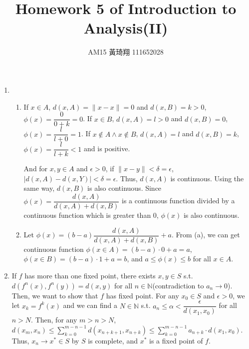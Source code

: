 \documentclass[12pt]{article}
\title{Homework 5 of Introduction to Analysis(II)}
\author{AM15 黃琦翔 111652028}
\begin{document}
\maketitle
\begin{enumerate}
    \item \begin{enumerate}
        \item If $x\in A$, $d(x, A) = \| x-x \| = 0$ and $d(x, B) = k > 0$, $\phi(x) = \dfrac{0}{0 + k} = 0$.
        If $x\in B$, $d(x, A) = l > 0$ and $d(x, B) = 0$, $\phi(x) = \dfrac{l}{l + 0} = 1$.
        If $x \notin A \wedge x \notin B$, $d(x, A) = l$ and $d(x, B) = k$, $\phi(x) = \dfrac{l}{l+k} < 1$ and is positive.

        And for $x, y \in A$ and $\epsilon > 0$,
        if $\| x- y \| < \delta = \epsilon$, 
        $|d(x, A) - d(x, Y)| < \delta = \epsilon$.
        Thus, $d(x, A)$ is continuous.
        Using the same way, $d(x, B)$ is also continuous.
        Since $\phi(x) = \dfrac{d(x, A)}{d(x, A)+d(x, B)}$ is a continuous function divided by a continuous function which is greater than $0$,
        $\phi(x)$ is also continuous.

        \item Let $\phi(x) = (b-a)\dfrac{d(x, A)}{d(x, A) + d(x, B)} + a$.
        From (a), we can get continuous function $\phi(x\in A) = (b-a)\cdot 0 + a = a$, $\phi(x\in B) = (b-a)\cdot 1 + a = b$,
        and $a \leq \phi(x)\leq b$ for all $x\in A$.
    \end{enumerate}

    \item If $f$ has more than one fixed point, there exists $x, y\in S$ s.t. $d(f^n(x), f^n(y)) = d(x, y)$ for all $n\in\mathbb{N}$(contradiction to $a_n \to 0$).
    Then, we want to show that $f$ has fixed point.
    For any $x_0\in S$ and $\epsilon > 0$, we let $x_k = f^k(x)$ and we can find a $N\in\mathbb{N}$ s.t. $a_n \leq \alpha < \dfrac{\epsilon}{d(x_1, x_0)}$ for all $n > N$.
    Then, for any $m > n > N$, $d(x_m, x_n) \leq \displaystyle\sum_{k=0}^{m-n-1} d(x_{n+k+1}, x_{n+k}) \leq \displaystyle\sum_{k=0}^{m-n-1} a_{n+k}\cdot d(x_1, x_0)$.
    Thus, $x_n \to x^*\in S$ by $S$ is complete, and $x^*$ is a fixed point of $f$.


\end{enumerate}
\end{document}
